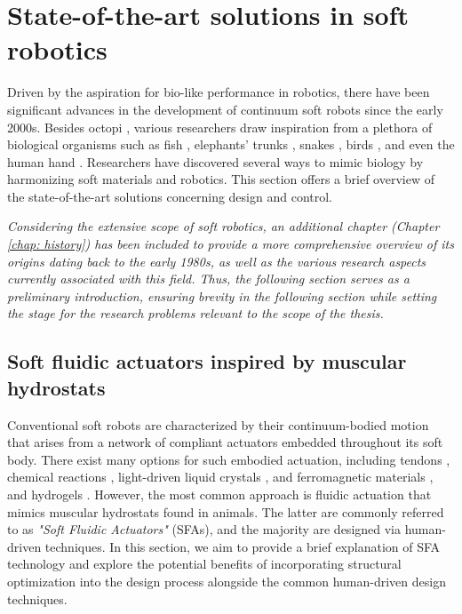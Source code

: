 \vspace{-3mm}
\section{State-of-the-art solutions in soft robotics}
Driven by the aspiration for bio-like performance in robotics, there have been significant advances in the development of continuum soft robots since the early 2000s. Besides octopi \cite{Renda2018,Chang2022,Mazzolai2019Oct}, various researchers draw inspiration from a plethora of biological organisms such as fish \cite{Katzschmann2018,Marchese2015}, elephants' trunks \cite{Jones2006,Wehner2016,Godage2015}, snakes \cite{Rafsanjani2018Feb,Gazzola2018,Marchese2015}, birds \cite{Gazzola2018,Zufferey2022Dec}, and even the human hand \cite{vanLaake2022Sep,Fras2018Oct}. Researchers have discovered several ways to mimic biology by harmonizing soft materials and robotics. This section offers a brief overview of the state-of-the-art solutions concerning design and control.

\begin{rmk}
\textit{Considering the extensive scope of soft robotics, an additional chapter (Chapter \ref{chap: history}) has been included to provide a more comprehensive overview of its origins dating back to the early 1980s, as well as the various research aspects currently associated with this field. Thus, the following section serves as a preliminary introduction, ensuring brevity in the following section while setting the stage for the research problems relevant to the scope of the thesis.}
\end{rmk}

\subsection{Soft fluidic actuators inspired by muscular hydrostats}
Conventional soft robots are characterized by their continuum-bodied motion that arises from a network of compliant actuators embedded throughout its soft body. There exist many options for such embodied actuation, including tendons \cite{Rucker2011Jul,Renda2017Aug}, chemical reactions \cite{Bartlett2015,Hubbard2021}, light-driven liquid crystals \cite{Vantomme2021,Pilz2020,daCunha2020}, and ferromagnetic materials \cite{Kim2019AugMagnet,Venkiteswaran2019Feb}, and hydrogels \cite{Jiao2022Jun,Lee2020Dec}. However, the most common approach is fluidic actuation \cite{Katzschmann2018,Marchese2015,Overvelde2015Sep,vanLaake2022Sep,Falkenhahn2015,DellaSantina2020a} that mimics muscular hydrostats found in animals. The latter are commonly referred to as \emph{"Soft Fluidic Actuators"} (SFAs), and the majority are designed via human-driven techniques. In this section, we aim to provide a brief explanation of SFA technology and explore the potential benefits of incorporating structural optimization into the design process alongside the common human-driven design techniques.

